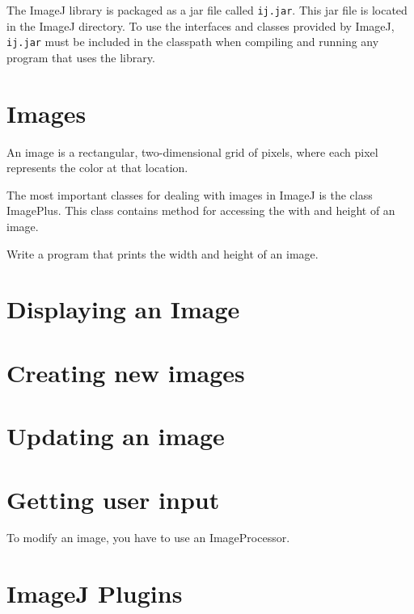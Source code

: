 \documentclass{book}
\begin{document}
The ImageJ library is packaged as a jar file called \texttt{ij.jar}. This jar file is located in the ImageJ directory. To use the interfaces and classes provided by ImageJ, \texttt{ij.jar} must be included in the classpath when compiling and running any program that uses the library.

\section{Images}
An image is a rectangular, two-dimensional grid of pixels, where each pixel represents the color at that location.



The most important classes for dealing with images in ImageJ is the class ImagePlus. This class contains method for accessing the with and height of an image. 

\begin{exercise}
Write a program that prints the width and height of an image. 
\end{exercise}

\section{Displaying an Image}

\section{Creating new images}

\section{Updating an image}

\section{Getting user input}

To modify an image, you have to use an ImageProcessor. 

\section{ImageJ Plugins}
\end{document}
